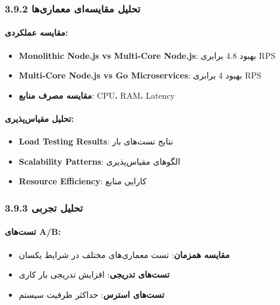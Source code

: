 \documentclass[
]{article}
\providecommand{\tightlist}{%
  \setlength{\itemsep}{0pt}\setlength{\parskip}{0pt}}
\begin{document}
\subsubsection{3.9.2 تحلیل مقایسه‌ای
معماری‌ها}\label{ux62aux62dux644ux6ccux644-ux645ux642ux627ux6ccux633ux647ux627ux6cc-ux645ux639ux645ux627ux631ux6ccux647ux627}

\paragraph{مقایسه
عملکردی:}\label{ux645ux642ux627ux6ccux633ux647-ux639ux645ux644ux6a9ux631ux62fux6cc-1}

\begin{itemize}
\tightlist
\item
  \textbf{Monolithic Node.js vs Multi-Core Node.js}: بهبود 4.8 برابری
  RPS
\item
  \textbf{Multi-Core Node.js vs Go Microservices}: بهبود 4 برابری RPS
\item
  \textbf{مقایسه مصرف منابع}: CPU، RAM، Latency
\end{itemize}

\paragraph{تحلیل
مقیاس‌پذیری:}\label{ux62aux62dux644ux6ccux644-ux645ux642ux6ccux627ux633ux67eux630ux6ccux631ux6cc}

\begin{itemize}
\tightlist
\item
  \textbf{Load Testing Results}: نتایج تست‌های بار
\item
  \textbf{Scalability Patterns}: الگوهای مقیاس‌پذیری
\item
  \textbf{Resource Efficiency}: کارایی منابع
\end{itemize}

\subsubsection{3.9.3 تحلیل
تجربی}\label{ux62aux62dux644ux6ccux644-ux62aux62cux631ux628ux6cc}

\paragraph{تست‌های A/B:}\label{ux62aux633ux62aux647ux627ux6cc-ab}

\begin{itemize}
\tightlist
\item
  \textbf{مقایسه همزمان}: تست معماری‌های مختلف در شرایط یکسان
\item
  \textbf{تست‌های تدریجی}: افزایش تدریجی بار کاری
\item
  \textbf{تست‌های استرس}: حداکثر ظرفیت سیستم
\end{itemize}
\end{document}
